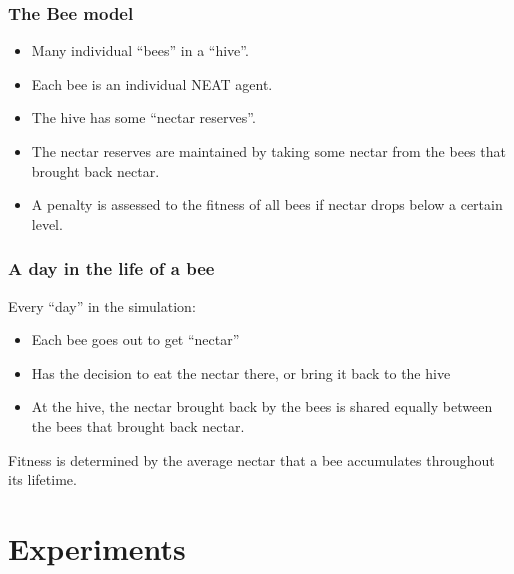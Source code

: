 \documentclass{beamer}
\begin{document}
      \begin{frame}[c]\frametitle{The Bee model}
        \begin{itemize}
          \item Many individual ``bees'' in a ``hive''.
          \item Each bee is an individual NEAT agent.
          \item The hive has some ``nectar reserves''.
          \item The nectar reserves are maintained by taking some nectar from the bees that brought 
                  back nectar.
          \item A penalty is assessed to the fitness of all bees if nectar 
                  drops below a certain level.
        \end{itemize}
      \end{frame}

    \begin{frame}[c]\frametitle{A day in the life of a bee}
      Every ``day'' in the simulation:
      \begin{itemize}
        \item Each bee goes out to get ``nectar''
        \item Has the decision to eat the nectar there, or bring it 
              back to the hive
        \item At the hive, the nectar brought back by the bees is 
              shared equally between the bees that brought back nectar.
      \end{itemize}
      Fitness is determined by the average nectar that a bee accumulates
      throughout its lifetime.
    \end{frame}



  \section{Experiments} %
  \label{sec:experiments}

    
      
\end{document}
